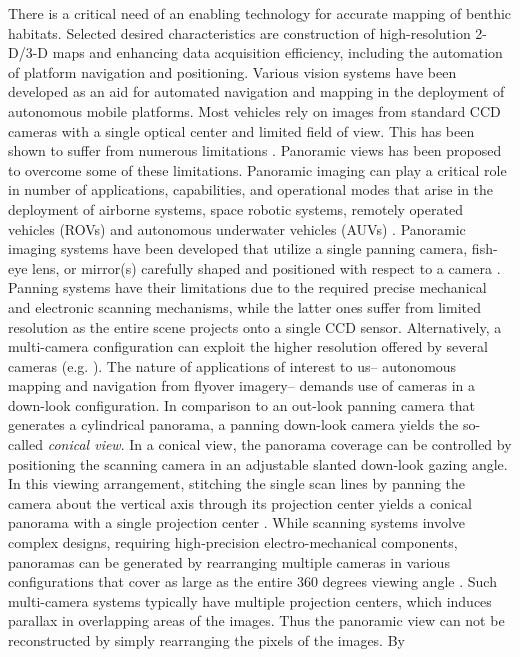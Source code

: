 There is a critical need of an enabling technology for accurate mapping of benthic habitats.
Selected desired characteristics are construction of high-resolution 2-D/3-D maps and enhancing
data acquisition efficiency, including the automation of platform navigation and positioning.
Various vision systems have been developed as an aid for automated navigation and mapping in the
deployment of autonomous mobile platforms. Most vehicles rely on images from standard CCD cameras
with a single optical center and limited field of view. This has been shown to suffer from numerous
limitations \cite{adi89,win00,yag90,yag91}. Panoramic views has been proposed to overcome some of
these limitations. Panoramic imaging can play a critical role in number of applications,
capabilities, and operational modes that arise in the deployment of airborne systems, space robotic
systems, remotely operated vehicles (ROVs) and autonomous underwater vehicles (AUVs)
\cite{fir03-1,neg01}. Panoramic imaging systems have been developed that utilize a single panning
camera, fish-eye lens, or mirror(s) carefully shaped and positioned with respect to a camera
\cite{ple03,pri01,zhu99}. Panning systems have their limitations due to the required precise
mechanical and electronic scanning mechanisms, while the latter ones suffer from limited resolution
as the entire scene projects onto a single CCD sensor. Alternatively, a multi-camera configuration
can exploit the higher resolution offered by several cameras (e.g. \cite{fir03-1,yok98}). The
nature of applications of interest to us-- autonomous mapping and navigation from flyover imagery--
demands use of cameras in a down-look configuration. In comparison to an out-look panning camera
that generates a cylindrical panorama, a panning down-look camera yields the so-called
\emph{conical view}. In a conical view, the panorama coverage can be controlled by positioning the
scanning camera in an adjustable slanted down-look gazing angle. In this viewing arrangement,
stitching the single scan lines by panning the camera about the vertical axis through its
projection center yields a conical panorama with a single projection center \cite{neg01}. While
scanning systems involve complex designs, requiring high-precision electro-mechanical components,
panoramas can be generated by rearranging multiple cameras in various configurations that cover as
large as the entire 360 degrees viewing angle \cite{swa99}. Such multi-camera systems typically
have multiple projection centers, which induces parallax in overlapping areas of the images. Thus
the panoramic view can not be reconstructed by simply rearranging the pixels of the images. By
